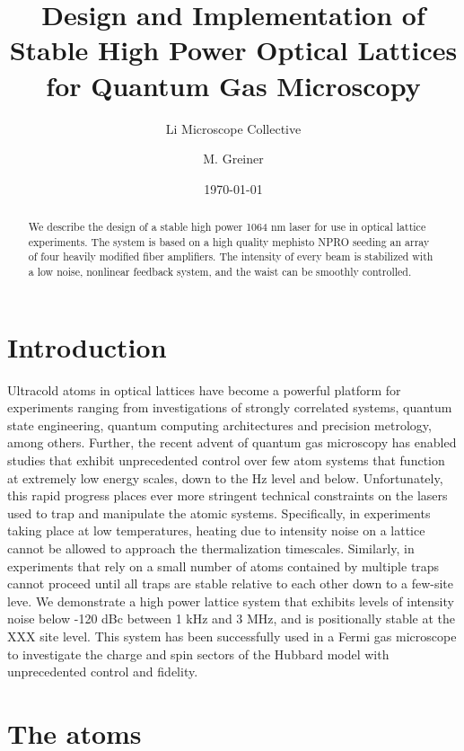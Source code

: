 \documentclass[twocolumn,aps,pra,showpacs,preprintnumbers,bibnotes]{revtex4-1}
\begin{document}
\title{Design and Implementation of Stable High Power Optical Lattices for Quantum Gas Microscopy}


\author{Li Microscope Collective}
\author{M. Greiner}

\date{\today}
\begin{abstract}
We describe the design of a stable high power 1064 nm laser for use in optical lattice experiments. The system is based on a high quality mephisto NPRO seeding an array of four heavily modified fiber amplifiers. The intensity of every beam is stabilized with a low noise, nonlinear feedback system, and the waist can be smoothly controlled. 
\end{abstract}
\maketitle
\section{Introduction}
Ultracold atoms in optical lattices have become a powerful platform for experiments ranging from investigations of strongly correlated systems, quantum state engineering, quantum computing architectures and precision metrology, among others.
Further, the recent advent of quantum gas microscopy has enabled studies that exhibit unprecedented control over few atom systems that function at extremely low energy scales, down to the Hz level and below.
Unfortunately, this rapid progress places ever more stringent technical constraints on the lasers used to trap and manipulate the atomic systems.
Specifically, in experiments taking place at low temperatures, heating due to intensity noise on a lattice cannot be allowed to approach the thermalization timescales.
Similarly, in experiments that rely on a small number of atoms contained by multiple traps cannot proceed until all traps are stable relative to each other down to a few-site leve.
We demonstrate a high power lattice system that exhibits levels of intensity noise below -120 dBc between 1 kHz and 3 MHz, and is positionally stable at the XXX site level. 
This system has been successfully used in a Fermi gas microscope to investigate the charge and spin sectors of the Hubbard model with unprecedented control and fidelity. 


\section{The atoms}
\end{document}
